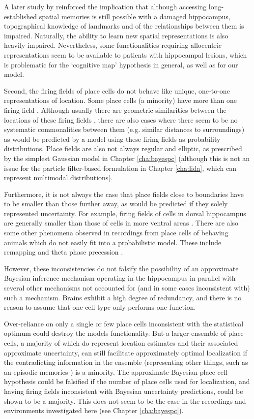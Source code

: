 A later study by \cite{maguire2006} reinforced the implication that although accessing long-established spatial memories is still possible with a damaged hippocampus, topographical knowledge of landmarks and of the relationships between them is impaired. Naturally, the ability to learn new spatial representations is also heavily impaired. Nevertheless, some functionalities requiring allocentric representations seem to be available to patients with hippocampal lesions, which is problematic for the `cognitive map' hypothesis in general, as well as for our model.

Second, the firing fields of place cells do not behave like unique, one-to-one representations of location. Some place cells (a minority) have more than one firing field \citep{burke2011influence}. Although usually there are geometric similarities between the locations of these firing fields \citep{barry2006boundary}, there are also cases where there seem to be no systematic commonalities \citep{park2011ensemble} between them (e.g. similar distances to surroundings) as would be predicted by a model using these firing fields as probability distributions. Place fields are also not always regular and elliptic, as prescribed by the simplest Gaussian model in Chapter \ref{cha:bayespc} (although this is not an issue for the particle filter-based formulation in Chapter \ref{cha:lida}, which can represent multimodal distributions). 

Furthermore, it is not always the case that place fields close to boundaries have to be smaller than those further away, as would be predicted if they solely represented uncertainty. For example, firing fields of cells in dorsal hippocampus are generally smaller than those of cells in more ventral areas \citep{kjelstrup2008finite}. There are also some other phenomena observed in recordings from place cells of behaving animals which do not easily fit into a probabilistic model. These include remapping \citep{colgin2008understanding} and theta phase precession \citep{skaggs1996theta}.

However, these inconsistencies do not falsify the possibility of an approximate Bayesian inference mechanism operating in the hippocampus in parallel with several other mechanisms not accounted for (and in some cases inconsistent with) such a mechanism. Brains exhibit a high degree of redundancy, and there is no reason to assume that one cell type only performs one function. 

Over-reliance on only a single or few place cells inconsistent with the statistical optimum could destroy the models functionality. But a larger ensemble of place cells, a majority of which do represent location estimates and their associated approximate uncertainty, can still facilitate approximately optimal localization if the contradicting information in the ensemble (representing other things, such as an episodic memories \citep{tulving1998episodic}) is a minority. The approximate Bayesian place cell hypothesis could be falsified if the number of place cells used for localization, and having firing fields inconsistent with Bayesian uncertainty predictions, could be shown to be a majority. This does not seem to be the case in the recordings and environments investigated here (see Chapter \ref{cha:bayespc}).

